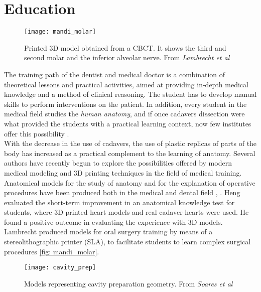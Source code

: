 \section{Education}
\begin{wrapfigure} {R} {0.4\textwidth}
\vspace{-20pt}
	\begin{center}
	\texttt{[image: mandi\_molar]}
    \caption{Printed 3D model obtained from a CBCT. It shows the third and second molar and the inferior alveolar nerve. From \emph{Lambrecht et al} \parencite{Reference69}}
    \label{fig:mandi_molar}
    \end{center}
\vspace{-20pt}
\end{wrapfigure}
The training path of the dentist and medical doctor is a combination of theoretical lessons and practical activities, aimed at providing in-depth medical knowledge and a method of clinical reasoning. The student has to develop manual skills to perform interventions on the patient. In addition, every student in the medical field studies the \emph{human anatomy}, and if once cadavers dissection were what provided the students with a practical learning context, now few institutes offer this possibility \parencite{Reference67}. \\
With the decrease in the use of cadavers, the use of plastic replicas of parts of the body has increased as a practical complement to the learning of anatomy. Several authors have recently begun to explore the possibilities offered by modern medical modeling and 3D printing techniques in the field of medical training. \\ Anatomical models for the study of anatomy and for the explanation of operative procedures have been produced both in the medical and dental field \parencite{Reference66 }, \parencite{Reference70}. Heng \parencite{Reference67} evaluated the short-term improvement in an anatomical knowledge test for students, where 3D printed heart models and real cadaver hearts were used. He found a positive outcome in evaluating the experience with 3D models. Lambrecht \parencite{Reference69} produced models for oral surgery training by means of a stereolithographic printer (SLA), to facilitate students to learn complex surgical procedures \ref{fig: mandi_molar}.
\begin{figure}[h]
\vspace{-10pt}
	\begin{center}
	\texttt{[image: cavity\_prep]}
    \caption{Models representing cavity preparation geometry. From \emph{Soares et al} \parencite{Reference71}}
    \label{fig:cavity_prep}
    \end{center}
\vspace{-20pt}
\end{figure}
 
